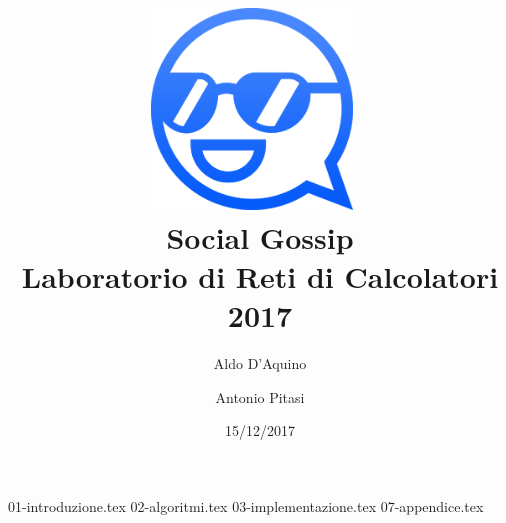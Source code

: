 \documentclass{article}
\title{%
\includegraphics[width=0.4\textwidth]{logo.png}~ 
\\[3cm]
\Huge Social Gossip \\
\large Laboratorio di Reti di Calcolatori 2017}
\author{Aldo D'Aquino \and Antonio Pitasi}
\date{15/12/2017}
\begin{document}
\maketitle

\newpage

{01-introduzione.tex}
{02-algoritmi.tex}
{03-implementazione.tex}
{07-appendice.tex}
\end{document}
